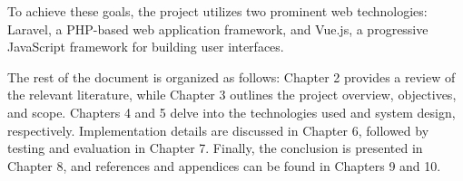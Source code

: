 To achieve these goals, the project utilizes two prominent web technologies: Laravel, a PHP-based web application framework, and Vue.js, a progressive JavaScript framework for building user interfaces.

The rest of the document is organized as follows: Chapter 2 provides a review of the relevant literature, while Chapter 3 outlines the project overview, objectives, and scope. Chapters 4 and 5 delve into the technologies used and system design, respectively. Implementation details are discussed in Chapter 6, followed by testing and evaluation in Chapter 7. Finally, the conclusion is presented in Chapter 8, and references and appendices can be found in Chapters 9 and 10.
